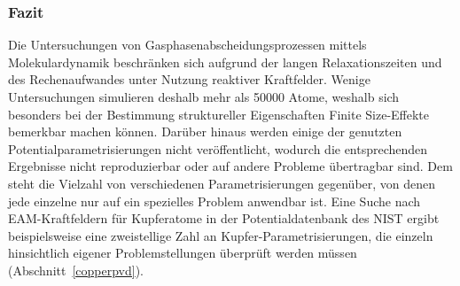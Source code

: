 \subsubsection{Fazit}
Die Untersuchungen von Gasphasenabscheidungsprozessen mittels Molekulardynamik beschränken sich aufgrund der langen Relaxationszeiten und des Rechenaufwandes unter Nutzung reaktiver Kraftfelder.
Wenige Untersuchungen simulieren deshalb mehr als \num{50000} Atome, weshalb sich besonders bei der Bestimmung struktureller Eigenschaften Finite Size-Effekte bemerkbar machen können.
Darüber hinaus werden einige der genutzten Potentialparametrisierungen nicht veröffentlicht, wodurch die entsprechenden Ergebnisse nicht reproduzierbar oder auf andere Probleme übertragbar sind.
Dem steht die Vielzahl von verschiedenen Parametrisierungen gegenüber, von denen jede einzelne nur auf ein spezielles Problem anwendbar ist.
Eine Suche nach EAM-Kraftfeldern für Kupferatome in der Potentialdatenbank des \textsc{NIST}\cite{becker_interatomic_2014} ergibt beispielsweise eine zweistellige Zahl an Kupfer-Parametrisierungen, die einzeln hinsichtlich eigener Problemstellungen überprüft werden müssen (Abschnitt~\ref{copperpvd}).
